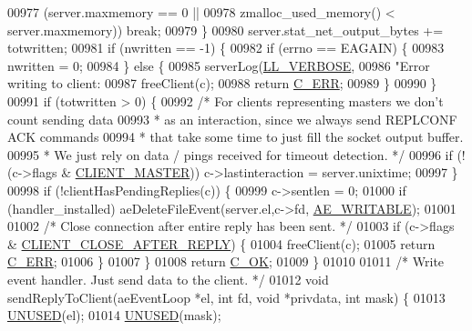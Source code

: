 \begin{DoxyCode}
{{{{{{{{{{00977             (server.maxmemory == 0 ||
00978              zmalloc\_used\_memory() < server.maxmemory)) \textcolor{keywordflow}{break};
00979     \}
00980     server.stat\_net\_output\_bytes += totwritten;
00981     \textcolor{keywordflow}{if} (nwritten == -1) \{
00982         \textcolor{keywordflow}{if} (errno == EAGAIN) \{
00983             nwritten = 0;
00984         \} \textcolor{keywordflow}{else} \{
00985             serverLog(\hyperlink{server_8h_a479b60032f8da6d8ad72e1a9d0809950}{LL\_VERBOSE},
00986                 \textcolor{stringliteral}{"Error writing to client: %
00987             freeClient(c);
00988             \textcolor{keywordflow}{return} \hyperlink{server_8h_af98ac28d5f4d23d7ed5985188e6fb7d1}{C\_ERR};
00989         \}
00990     \}
00991     \textcolor{keywordflow}{if} (totwritten > 0) \{
00992         \textcolor{comment}{/* For clients representing masters we don't count sending data}
00993 \textcolor{comment}{         * as an interaction, since we always send REPLCONF ACK commands}
00994 \textcolor{comment}{         * that take some time to just fill the socket output buffer.}
00995 \textcolor{comment}{         * We just rely on data / pings received for timeout detection. */}
00996         \textcolor{keywordflow}{if} (!(c->flags & \hyperlink{server_8h_a3d8f0cc8d0653ee2b6dafb454292c069}{CLIENT\_MASTER})) c->lastinteraction = server.unixtime;
00997     \}
00998     \textcolor{keywordflow}{if} (!clientHasPendingReplies(c)) \{
00999         c->sentlen = 0;
01000         \textcolor{keywordflow}{if} (handler\_installed) aeDeleteFileEvent(server.el,c->fd,
      \hyperlink{ae_8h_ab6bfb0366ccb6277112d132c2a2bf500}{AE\_WRITABLE});
01001 
01002         \textcolor{comment}{/* Close connection after entire reply has been sent. */}
01003         \textcolor{keywordflow}{if} (c->flags & \hyperlink{server_8h_a8cff2154afcc2e87ac85bdbbe2814091}{CLIENT\_CLOSE\_AFTER\_REPLY}) \{
01004             freeClient(c);
01005             \textcolor{keywordflow}{return} \hyperlink{server_8h_af98ac28d5f4d23d7ed5985188e6fb7d1}{C\_ERR};
01006         \}
01007     \}
01008     \textcolor{keywordflow}{return} \hyperlink{server_8h_a303769ef1065076e68731584e758d3e1}{C\_OK};
01009 \}
01010 
01011 \textcolor{comment}{/* Write event handler. Just send data to the client. */}
01012 \textcolor{keywordtype}{void} sendReplyToClient(aeEventLoop *el, \textcolor{keywordtype}{int} fd, \textcolor{keywordtype}{void} *privdata, \textcolor{keywordtype}{int} mask) \{
01013     \hyperlink{server_8h_ae7c9dc8f13568a9c856573751f1ee1ec}{UNUSED}(el);
01014     \hyperlink{server_8h_ae7c9dc8f13568a9c856573751f1ee1ec}{UNUSED}(mask);
}}}}}}}}}}}
\end{DoxyCode}
